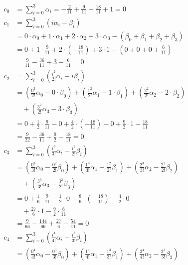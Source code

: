 \begin{align}
    c_0 &= \sum_{i=0}^{3} \alpha_i = -\frac{2}{11} + \frac{9}{11} - \frac{18}{11} + 1 = 0 \\
    c_1 &= \sum_{i=0}^{3} (i\alpha_i - \beta_i) \\
    &= 0 \cdot \alpha_0 + 1 \cdot \alpha_1 + 2 \cdot \alpha_2 + 3 \cdot \alpha_3 - (\beta_0 + \beta_1 + \beta_2 + \beta_3) \nonumber \\
    &= 0 + 1 \cdot \frac{9}{11} + 2 \cdot \left(-\frac{18}{11}\right) + 3 \cdot 1 - \left(0 + 0 + 0 + \frac{6}{11}\right) \nonumber \\
    &= \frac{9}{11} - \frac{36}{11} + 3 - \frac{6}{11} = 0 \\
    c_2 &= \sum_{i=0}^{3} \left(\frac{i^2}{2!} \alpha_i - i \beta_i \right) \\
    &= \left(\frac{0^2}{2!} \alpha_0 - 0 \cdot \beta_0\right) + \left(\frac{1^2}{2!} \alpha_1 - 1 \cdot \beta_1\right) + \left(\frac{2^2}{2!} \alpha_2 - 2 \cdot \beta_2\right) \nonumber \\
    &\quad+ \left(\frac{3^2}{2!} \alpha_3 - 3 \cdot \beta_3\right) \nonumber \\
    &= 0 + \frac{1}{2} \cdot \frac{9}{11} - 0 + \frac{4}{2} \cdot \left(-\frac{18}{11}\right) - 0 + \frac{9}{2} \cdot 1 - \frac{18}{11} \nonumber \\
    &= \frac{9}{22} - \frac{36}{11} + \frac{9}{2} - \frac{18}{11} = 0 \\
    c_3 &= \sum_{i=0}^{3} \left(\frac{i^3}{3!} \alpha_i - \frac{i^2}{2!} \beta_i \right) \\
    &= \left(\frac{0^3}{3!} \alpha_0 - \frac{0^2}{2!} \beta_0\right) + \left(\frac{1^3}{3!} \alpha_1 - \frac{1^2}{2!} \beta_1\right) + \left(\frac{2^3}{3!} \alpha_2 - \frac{2^2}{2!} \beta_2\right) \nonumber \\
    &\quad+ \left(\frac{3^3}{3!} \alpha_3 - \frac{3^2}{2!} \beta_3\right) \nonumber \\
    &= 0 + \frac{1}{6} \cdot \frac{9}{11} - \frac{1}{2} \cdot 0 + \frac{8}{6} \cdot \left(-\frac{18}{11}\right) - \frac{4}{2} \cdot 0 \nonumber \\
    &\quad+ \frac{27}{6} \cdot 1 - \frac{9}{2} \cdot \frac{6}{11} \nonumber \\
    &= \frac{9}{66} - \frac{144}{66} + \frac{27}{6} - \frac{54}{11} = 0 \\
    c_4 &= \sum_{i=0}^{3} \left(\frac{i^4}{4!} \alpha_i - \frac{i^3}{3!} \beta_i \right) \\
    &= \left(\frac{0^4}{4!} \alpha_0 - \frac{0^3}{3!} \beta_0 \right) + \left(\frac{1^4}{4!} \alpha_1 - \frac{1^3}{3!} \beta_1 \right) + \left(\frac{2^4}{4!} \alpha_2 - \frac{2^3}{3!} \beta_2 \right) \nonumber \\

\end{align}
